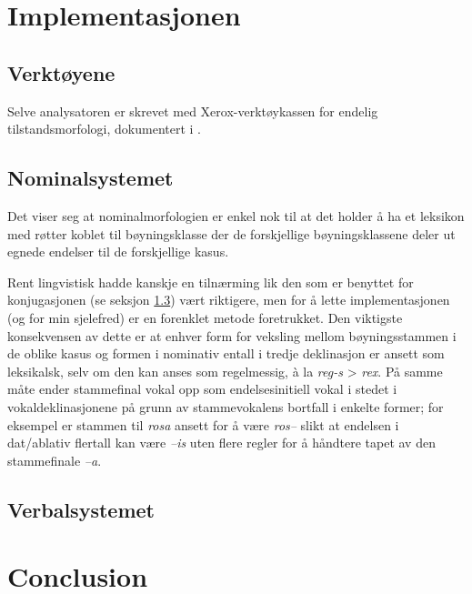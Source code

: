 \documentclass{article}
\begin{document}
\section{Implementasjonen}
\subsection{Verkt\o{}yene}
Selve analysatoren er skrevet med Xerox-verkt\o{}ykassen for endelig
tilstandsmorfologi, dokumentert i .


\subsection{Nominalsystemet}
Det viser seg at nominalmorfologien er enkel nok til at det holder \aa{} ha et
leksikon med r\o{}tter koblet til b\o{}yningsklasse der de forskjellige
b\o{}yningsklassene deler ut egnede endelser til de forskjellige kasus.

Rent lingvistisk hadde kanskje en tiln\ae{}rming lik den som er benyttet for
konjugasjonen (se seksjon \ref{conjugation}) v\ae{}rt riktigere, men for \aa{}
lette implementasjonen (og for min sjelefred) er en forenklet metode
foretrukket. Den viktigste konsekvensen av dette er at enhver form for
veksling mellom b\o{}yningsstammen i de oblike kasus og formen i nominativ
entall i tredje deklinasjon er ansett som leksikalsk, selv om den kan anses
som regelmessig, \`a la \emph{reg-s} > \emph{rex}. P\aa{} samme m\aa{}te ender
stammefinal vokal opp som endelsesinitiell vokal i stedet i
vokaldeklinasjonene p\aa{} grunn av stammevokalens bortfall i enkelte former;
for eksempel er stammen til \emph{rosa} ansett for \aa{} v\ae{}re \emph{ros--}
slikt at endelsen i dat/ablativ flertall kan v\ae{}re \emph{--is} uten flere
regler for \aa{} h\aa{}ndtere tapet av den stammefinale \emph{--a}.

\subsection{Verbalsystemet}
\label{conjugation}

\section{Conclusion} %

{}
\end{document}
